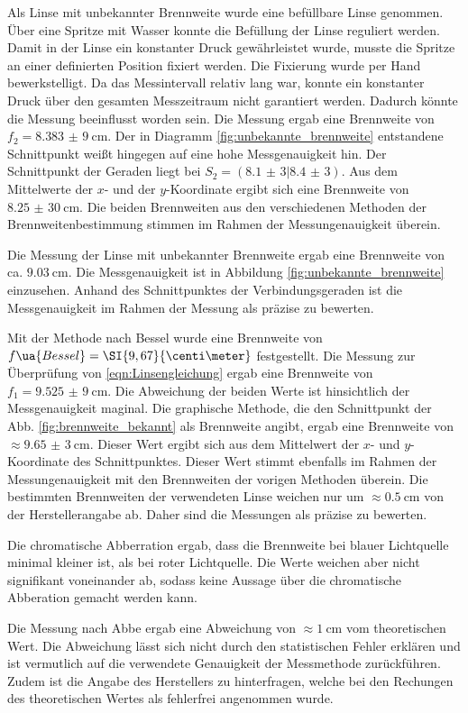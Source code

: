 Als Linse mit unbekannter Brennweite wurde eine befüllbare Linse genommen. Über eine
Spritze mit Wasser konnte die Befüllung der Linse reguliert werden.
Damit in der Linse ein konstanter Druck gewährleistet wurde, musste die Spritze an
einer definierten Position fixiert werden.
Die Fixierung wurde per Hand bewerkstelligt. Da das Messintervall relativ lang
war, konnte ein konstanter Druck über den gesamten Messzeitraum nicht
garantiert werden. Dadurch könnte
die Messung beeinflusst worden sein. Die Messung ergab eine Brennweite von
$f_2 = \SI{8,383(9)}{\centi\meter}$. Der in Diagramm
\ref{fig:unbekannte_brennweite} entstandene Schnittpunkt weißt hingegen auf eine
hohe Messgenauigkeit hin. Der Schnittpunkt der Geraden liegt bei $S_2 =
(\num{8,1(3)}|\num{8,4(3)})$.
Aus dem Mittelwerte der $x$- und der $y$-Koordinate ergibt sich eine
Brennweite von $\SI{8,25(30)}{\centi\meter}$.
Die beiden Brennweiten aus den verschiedenen Methoden der Brennweitenbestimmung
stimmen im Rahmen der Messungenauigkeit überein.

Die Messung der Linse mit unbekannter Brennweite ergab eine Brennweite von ca. $\SI{9,03}{\centi\meter}$.
Die Messgenauigkeit ist in Abbildung \ref{fig:unbekannte_brennweite} einzusehen.
Anhand des Schnittpunktes der Verbindungsgeraden ist die Messgenauigkeit im Rahmen
der Messung als präzise zu bewerten.

Mit der Methode nach Bessel wurde eine Brennweite von $f\ua{Bessel} =
\SI{9,67}{\centi\meter}$ festgestellt. Die Messung zur Überprüfung von
\eqref{eqn:Linsengleichung} ergab eine Brennweite von $f_1 =
\SI{9,525(9)}{\centi\meter}$. Die Abweichung der beiden Werte ist
hinsichtlich der Messgenauigkeit maginal. Die graphische Methode, die den
Schnittpunkt der Abb. \ref{fig:brennweite_bekannt} als Brennweite
angibt, ergab eine Brennweite von $\approx \SI{9,65(3)}{\centi\meter}$.
Dieser Wert ergibt sich aus dem Mittelwert der $x$- und $y$- Koordinate
des Schnittpunktes. Dieser Wert stimmt ebenfalls im Rahmen der
Messungenauigkeit mit den Brennweiten der vorigen Methoden überein.
Die bestimmten Brennweiten der verwendeten Linse weichen nur um $\approx\SI{0,5}{\centi\meter}$
von der Herstellerangabe ab. Daher sind die Messungen als präzise zu bewerten.

Die chromatische Abberration ergab, dass die Brennweite bei blauer Lichtquelle
minimal kleiner ist, als bei roter Lichtquelle. Die Werte weichen aber nicht
signifikant voneinander ab, sodass keine Aussage über die chromatische
Abberation gemacht werden kann.

Die Messung nach Abbe ergab eine Abweichung von
$\approx\SI{1}{\centi\meter}$ vom theoretischen Wert. Die Abweichung lässt
sich nicht durch den statistischen Fehler erklären und ist vermutlich
auf die verwendete Genauigkeit der Messmethode zurückführen. Zudem ist die Angabe des Herstellers
zu hinterfragen, welche bei den Rechungen des theoretischen Wertes als fehlerfrei
angenommen wurde.
